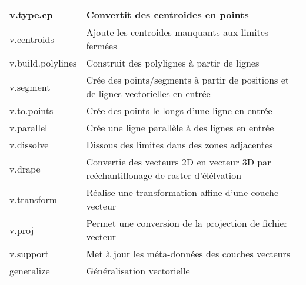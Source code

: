 \begin{table}[ht]
\begin{tabular}{|p{4cm}|p{12cm}|}
  \hline v.type.cp & Convertit des centroides en points \\
  \hline v.centroids & Ajoute les centroides manquants aux limites ferm\'ees\\
  \hline v.build.polylines & Construit des polylignes \`a partir de lignes\\
  \hline v.segment & Cr\'ee des points/segments \`a partir de positions et de lignes vectorielles en entr\'ee\\
  \hline v.to.points & Cr\'ee des points le longs d'une ligne en entr\'ee\\
  \hline v.parallel & Cr\'ee une ligne parall\`ele \`a des lignes en entr\'ee\\
  \hline v.dissolve & Dissous des limites dans des zones adjacentes\\
  \hline v.drape & Convertie des vecteurs 2D en vecteur 3D par re\'echantillonage de raster d'\'el\'elvation\\
  \hline v.transform & R\'ealise une transformation affine d'une couche vecteur\\
  \hline v.proj & Permet une conversion de la projection de fichier vecteur\\
  \hline v.support & Met \`a jour les m\'eta-donn\'ees des couches vecteurs\\
  \hline generalize & G\'en\'eralisation vectorielle\\
\hline
\end{tabular}
\end{table}

